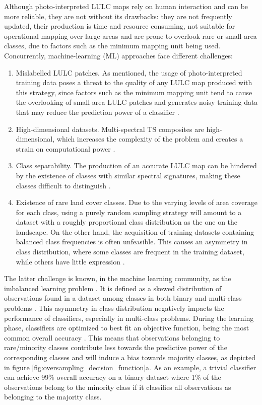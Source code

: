 \documentclass[parskip=full]{scrartcl}
\begin{document}
Although photo-interpreted LULC maps rely on human interaction and can be more
reliable, they are not without its drawbacks: they are not frequently updated,
their production is time and resource consuming, not suitable for operational
mapping over large areas and are prone to overlook rare or small-area classes,
due to factors such as the minimum mapping unit being used. Concurrently,
machine-learning (ML) approaches face different challenges:
\begin{enumerate}
	\item Mislabelled LULC patches. As mentioned, the usage of photo-interpreted training
	      data poses a threat to the quality of any LULC map produced with this strategy,
	      since factors such as the minimum mapping unit tend to cause the overlooking of
	      small-area LULC patches and generates noisy training data that may reduce the
	      prediction power of a classifier \cite{Pelletier2017}.
	\item High-dimensional datasets. Multi-spectral TS composites are high-dimensional,
	      which increases the complexity of the problem and creates a strain on
	      computational power \cite{Stromann2020}.
	\item Class separability. The production of an accurate LULC map can be hindered by
	      the existence of classes with similar spectral signatures, making these classes
	      difficult to distinguish \cite{Alonso-Sarria2019}.
	\item Existence of rare land cover classes. Due to the varying levels of area
	      coverage for each class, using a purely random sampling strategy will amount to
	      a dataset with a roughly proportional class distribution as the one on the
	      landscape. On the other hand, the acquisition of training datasets containing
	      balanced class frequencies is often unfeasible. This causes an asymmetry in
	      class distribution, where some classes are frequent in the training dataset,
	      while others have little expression \cite{Wang2019, Feng2019}.
\end{enumerate}


The latter challenge is known, in the machine learning community, as the
imbalanced learning problem \cite{Chawla2004}. It is defined as a skewed
distribution of observations found in a dataset among classes in both binary
and multi-class problems \cite{Abdi2016}. This asymmetry in class
distribution negatively impacts the performance of classifiers, especially in
multi-class problems. During the learning phase, classifiers are optimized to
best fit an objective function, being the most common overall accuracy
\cite{Maxwell2018}. This means that observations belonging to rare/minority
classes contribute less towards the predictive power of the corresponding
classes and will induce a bias towards majority classes, as depicted in figure
\ref{fig:oversampling_decision_function}a. As an example, a trivial classifier can achieve 99\%
overall accuracy on a binary dataset where 1\% of the observations belong to
the minority class if it classifies all observations as belonging to the
majority class.
\end{document}

